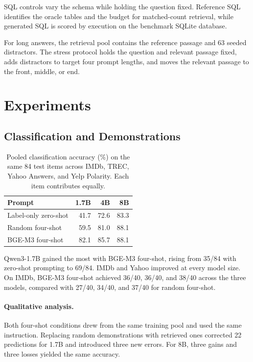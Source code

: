 \documentclass{article}
\begin{document}
SQL controls vary the schema while holding the question fixed. Reference SQL identifies the oracle
tables and the budget for matched-count retrieval, while generated SQL is scored by execution on the
benchmark SQLite database.

For long answers, the retrieval pool contains the reference passage and 63 seeded distractors. The
stress protocol holds the question and relevant passage fixed, adds distractors to target four
prompt lengths, and moves the relevant passage to the front, middle, or end.

\clearpage


\section{Experiments}

\subsection{Classification and Demonstrations}

\begin{table}[H]
\centering
\caption{Pooled classification accuracy (\%) on the same 84 test items across IMDb, TREC, Yahoo
Answers, and Yelp Polarity. Each item contributes equally.}
\small
\begin{tabular*}{\columnwidth}{@{\extracolsep{\fill}}lrrr@{}}
\toprule
\textbf{Prompt} & \textbf{1.7B} & \textbf{4B} & \textbf{8B} \\
\midrule
Label-only zero-shot & 41.7 & 72.6 & 83.3 \\
Random four-shot & 59.5 & 81.0 & 88.1 \\
BGE-M3 four-shot & 82.1 & 85.7 & 88.1 \\
\bottomrule
\end{tabular*}
\end{table}

Qwen3-1.7B gained the most with BGE-M3 four-shot, rising from 35/84 with zero-shot prompting
to 69/84. IMDb and Yahoo improved at every model size. On IMDb, BGE-M3 four-shot achieved
36/40, 36/40, and 38/40 across the three models, compared with 27/40, 34/40, and 37/40
for random four-shot.

\paragraph{Qualitative analysis.}

Both four-shot conditions drew from the same training pool and used the same instruction.
Replacing random demonstrations with retrieved ones corrected 22 predictions for 1.7B and
introduced three new errors. For 8B, three gains and three losses yielded the same accuracy.
\end{document}
